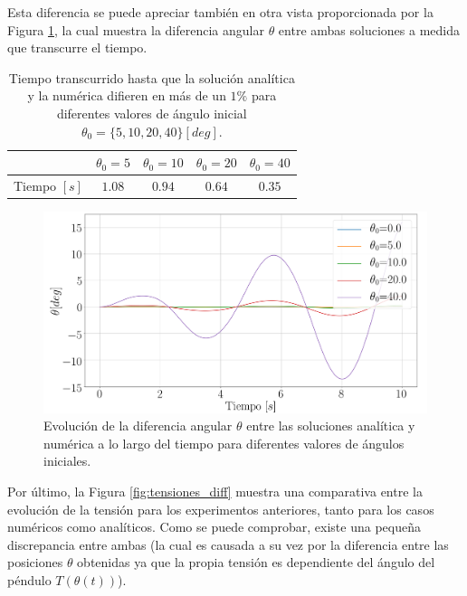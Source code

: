 \documentclass[journal]{IEEEtran}
\begin{document}
Esta diferencia se puede apreciar también en otra vista proporcionada por la Figura \ref{fig:diff}, la cual muestra la diferencia angular $\theta$ entre ambas soluciones a medida que transcurre el tiempo.

\begin{table}[!htb]
  \centering
  \begin{tabular}{c|cccc}
    & $\theta_0 = 5$ & $\theta_0 = 10$ & $\theta_0 = 20$ & $\theta_0 = 40$\\
    \hline
    Tiempo $[s]$ & $1.08$ & $0.94$ & $0.64$ & $0.35$\\
    \hline
  \end{tabular}
  \caption{Tiempo transcurrido hasta que la solución analítica y la numérica difieren en más de un $1\%$ para diferentes valores de ángulo inicial $\theta_0 = \{5, 10, 20, 40\} [deg]$.}
  \label{table:tiempodiff}
\end{table}

\begin{figure}[!htb]
  \centering
  \includegraphics[width=\linewidth]{theta_diff}
  \caption{Evolución de la diferencia angular $\theta$ entre las soluciones analítica y numérica a lo largo del tiempo para diferentes valores de ángulos iniciales.}
  \label{fig:diff}
\end{figure}

Por último, la Figura \ref{fig:tensiones_diff} muestra una comparativa entre la evolución de la tensión para los experimentos anteriores, tanto para los casos numéricos como analíticos. Como se puede comprobar, existe una pequeña discrepancia entre ambas (la cual es causada a su vez por la diferencia entre las posiciones $\theta$ obtenidas ya que la propia tensión es dependiente del ángulo del péndulo $T(\theta(t))$).
\end{document}

